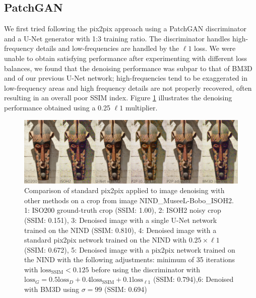 \subsection{PatchGAN}

We first tried following the pix2pix approach using a PatchGAN discriminator and a U-Net generator \cite{pix2pix} with 1:3 training ratio. The discriminator handles high-frequency details and low-frequencies are handled by the $\ell 1$ loss. We were unable to obtain satisfying performance after experimenting with different loss balances, we found that the denoising performance was subpar to that of \ac{BM3D} and of our previous U-Net network; high-frequencies tend to be exaggerated in low-frequency areas and high frequency details are not properly recovered, often resulting in an overall poor \ac{SSIM} index. Figure \ref{fig:p2p-def} illustrates the denoising performance obtained using a 0.25 $\ell 1$ multiplier.

\begin{figure}[!htbp]
  \begin{center}
    \includegraphics[width=1\linewidth]{gfx/comp/p2p_def.jpg}
    \caption[Initial (c)GAN denoising (visual comparison)]{Comparison of standard pix2pix \cite{pix2pix} applied to image denoising with other methods on a crop from image NIND\_MuseeL-Bobo\_ISOH2. 1: ISO200 ground-truth crop (SSIM: 1.00), 2: ISOH2 noisy crop (SSIM: 0.151), 3: Denoised image with a single U-Net network trained on the \ac{NIND} (SSIM: 0.810), 4: Denoised image with a standard pix2pix network trained on the \ac{NIND} with $0.25\times\ell 1$ (SSIM: 0.672), 5: Denoised image with a pix2pix network trained on the \ac{NIND} with the following adjustments: minimum of 35 iterations with $\text{loss}_\text{SSIM} < 0.125$ before using the discriminator with $\text{loss}_G=0.5 \text{loss}_D + 0.4 \text{loss}_\text{SSIM} + 0.1 \text{loss}_{\ell 1}$ (SSIM: 0.794),6: Denoised with \ac{BM3D} using $\sigma=99$ (SSIM: 0.694)}
    \label{fig:p2p-def}
  \end{center}
\end{figure}

